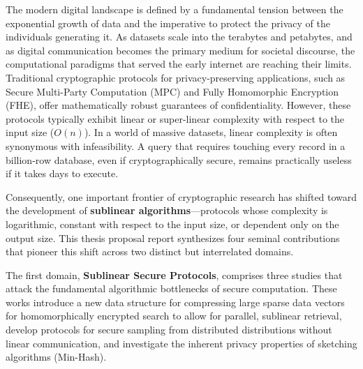 

The modern digital landscape is defined by a fundamental tension between the exponential growth of data and the imperative to protect the privacy of the individuals generating it. As datasets scale into the terabytes and petabytes, and as digital communication becomes the primary medium for societal discourse, the computational paradigms that served the early internet are reaching their limits. Traditional cryptographic protocols for privacy-preserving applications, such as Secure Multi-Party Computation (MPC) and Fully Homomorphic Encryption (FHE), offer mathematically robust guarantees of confidentiality. However, these protocols typically exhibit linear or super-linear complexity with respect to the input size ($O(n)$). In a world of massive datasets, linear complexity is often synonymous with infeasibility. A query that requires touching every record in a billion-row database, even if cryptographically secure, remains practically useless if it takes days to execute.

Consequently, one important frontier of cryptographic research has shifted toward the development of \textbf{sublinear algorithms}—protocols whose complexity is logarithmic, constant with respect to the input size, or dependent only on the output size. This thesis proposal report synthesizes four seminal contributions that pioneer this shift across two distinct but interrelated domains.

The first domain, \textbf{Sublinear Secure Protocols}, comprises three studies that attack the fundamental algorithmic bottlenecks of secure computation. These works introduce a new data structure for compressing large sparse data vectors for homomorphically encrypted search to allow for parallel, sublinear retrieval, develop protocols for secure sampling from distributed distributions without linear communication, and investigate the inherent privacy properties of sketching algorithms (Min-Hash).

